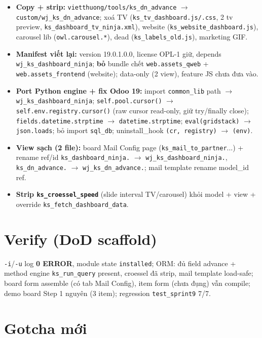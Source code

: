 \begin{itemize}
  \item \textbf{Copy + strip:} \texttt{vietthuong/tools/ks\_dn\_advance} $\to$
    \texttt{custom/wj\_ks\_dn\_advance}; xoá TV (\texttt{ks\_tv\_dashboard.js/.css}, 2 tv
    preview, \texttt{ks\_dashboard\_tv\_ninja.xml}), website (\texttt{ks\_website\_dashboard.js}),
    carousel lib (\texttt{owl.carousel.*}), dead (\texttt{ks\_labels\_old.js}), marketing GIF.
  \item \textbf{Manifest viết lại:} version 19.0.1.0.0, license OPL-1 giữ, depends
    \texttt{wj\_ks\_dashboard\_ninja}; \textbf{bỏ} bundle chết \texttt{web.assets\_qweb} +
    \texttt{web.assets\_frontend} (website); data-only (2 view), feature JS chưa đưa vào.
  \item \textbf{Port Python engine + fix Odoo 19:} import \texttt{common\_lib} path $\to$
    \texttt{wj\_ks\_dashboard\_ninja}; \texttt{self.pool.cursor()} $\to$
    \texttt{self.env.registry.cursor()} (raw cursor read-only, giữ try/finally close);
    \texttt{fields.datetime.strptime} $\to$ \texttt{datetime.strptime}; \texttt{eval(gridstack)}
    $\to$ \texttt{json.loads}; bỏ import \texttt{sql\_db}; uninstall\_hook
    \texttt{(cr, registry)} $\to$ \texttt{(env)}.
  \item \textbf{View sạch (2 file):} board Mail Config page (\texttt{ks\_mail\_to\_partner}...)
    + rename ref/id \texttt{ks\_dashboard\_ninja.} $\to$ \texttt{wj\_ks\_dashboard\_ninja.},
    \texttt{ks\_dn\_advance.} $\to$ \texttt{wj\_ks\_dn\_advance.}; mail template rename model\_id ref.
  \item \textbf{Strip \texttt{ks\_croessel\_speed}} (slide interval TV/carousel) khỏi model +
    view + override \texttt{ks\_fetch\_dashboard\_data}.
\end{itemize}

\section{Verify (DoD scaffold)}

\texttt{-i}/\texttt{-u} log \textbf{0 ERROR}, module state \texttt{installed}; ORM: đủ field
advance + method engine \texttt{ks\_run\_query} present, croessel đã strip, mail template
load-safe; board form assemble (có tab Mail Config), item form (chưa đụng) vẫn compile;
demo board Step 1 nguyên (3 item); regression \texttt{test\_sprint9} 7/7.

\section{Gotcha mới}

